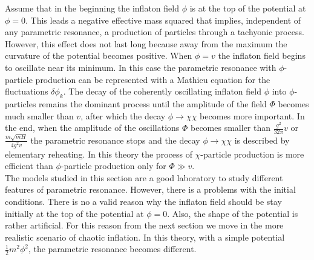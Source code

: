 \documentclass[11pt,a4paper,twoside]{book}
\begin{document}
Assume that in the beginning the inflaton field $ \phi $ is at the top of the potential at $ \phi=0 $. This leads a negative effective mass squared that implies, independent of any parametric resonance, a production of particles through a tachyonic process. However, this effect does not last long because away from the maximum the curvature of the potential becomes positive. When $ \phi = v $ the inflaton field begins to oscillate near its minimum. In this case the parametric resonance  with $ \phi $-particle production can be represented with a Mathieu equation  for the fluctuations $\delta \phi_{k}$. 
The decay of the coherently oscillating inflaton field $\phi$ into $\phi$-particles remains the dominant process until the amplitude of the field $\Phi$ becomes much smaller than $ v $, after which the decay $ \phi \rightarrow \chi \chi $ becomes more important. In the end, when the amplitude of the oscillations $ \Phi $ becomes smaller than $ \frac{g^{2}}{32\pi}v $  or   $ \frac{m\sqrt{mH}}{4g^{2}v} $ the parametric resonance stops and the decay $ \phi \rightarrow \chi \chi $ is described by elementary reheating.
In this theory the process of $ \chi $-particle production is more efficient than $\phi$-particle production only for $ \Phi \gg v $.\\
The models studied in this section are a good laboratory to study different features of parametric resonance. However, there is a problems with the initial conditions. There is no a valid reason why the inflaton field should be stay initially at the top of the potential at $ \phi=0 $. Also, the shape of the potential is rather artificial. For this reason from the next section we move in the more realistic scenario of chaotic inflation. In this theory, with a simple potential $ \frac{1}{2}m^{2}\phi^{2} $, the parametric resonance becomes different.
\end{document}

